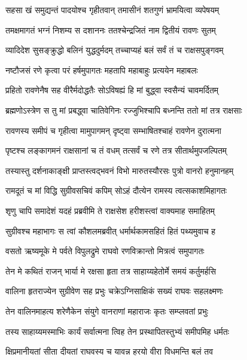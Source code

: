 \twolineshloka
{सहसा खं समुद्यन्तं पादयोश्च गृहीतवान्}
{तमासीनं शतगुणं भ्रामयित्वा व्यपेषयम्} %

\twolineshloka
{तमक्षमागतं भग्नं निशम्य स दशाननः}
{ततश्चेन्द्रजितं नाम द्वितीयं रावणः सुतम्} %

\twolineshloka
{व्यादिदेश सुसङ्क्रुद्धो बलिनं युद्धदुर्मदम्}
{तच्चाप्यहं बलं सर्वं तं च राक्षसपुङ्गवम्} %

\twolineshloka
{नष्टौजसं रणे कृत्वा परं हर्षमुपागतः}
{महतापि महाबाहुः प्रत्ययेन महाबलः} %

\twolineshloka
{प्रहितो रावणेनैष सह वीरैर्मदोद्धतैः}
{सोऽविषह्यं हि मां बुद्ध्वा स्वसैन्यं चावमर्दितम्} %

\twolineshloka
{ब्रह्मणोऽस्त्रेण स तु मां प्रबद्ध्वा चातिवेगिनः}
{रज्जुभिश्चापि बध्नन्ति ततो मां तत्र राक्षसाः} %

\twolineshloka
{रावणस्य समीपं च गृहीत्वा मामुपागमन्}
{दृष्ट्वा सम्भाषितश्चाहं रावणेन दुरात्मना} %

\twolineshloka
{पृष्टश्च लङ्कागमनं राक्षसानां च तं वधम्}
{तत्सर्वं च रणे तत्र सीतार्थमुपजल्पितम्} %

\twolineshloka
{तस्यास्तु दर्शनाकाङ्क्षी प्राप्तस्त्वद्भवनं विभो}
{मारुतस्यौरसः पुत्रो वानरो हनुमानहम्} %

\twolineshloka
{रामदूतं च मां विद्धि सुग्रीवसचिवं कपिम्}
{सोऽहं दौत्येन रामस्य त्वत्सकाशमिहागतः} %

\twolineshloka
{शृणु चापि समादेशं यदहं प्रब्रवीमि ते}
{राक्षसेश हरीशस्त्वां वाक्यमाह समाहितम्} %

\twolineshloka
{सुग्रीवश्च महाभागः स त्वां कौशलमब्रवीत्}
{धर्मार्थकामसहितं हितं पथ्यमुवाच ह} %

\twolineshloka
{वसतो ऋष्यमूके मे पर्वते विपुलद्रुमे}
{राघवो रणविक्रान्तो मित्रत्वं समुपागतः} %

\twolineshloka
{तेन मे कथितं राजन् भार्या मे रक्षसा हृता}
{तत्र साहाय्यहेतोर्मे समयं कर्तुमर्हसि} %

\twolineshloka
{वालिना हृतराज्येन सुग्रीवेण सह प्रभुः}
{चक्रेऽग्निसाक्षिकं सख्यं राघवः सहलक्ष्मणः} %

\twolineshloka
{तेन वालिनमाहत्य शरेणैकेन संयुगे}
{वानराणां महाराजः कृतः सम्प्लवतां प्रभुः} %

\twolineshloka
{तस्य साहाय्यमस्माभिः कार्यं सर्वात्मना त्विह}
{तेन प्रस्थापितस्तुभ्यं समीपमिह धर्मतः} %

\twolineshloka
{क्षिप्रमानीयतां सीता दीयतां राघवस्य च}
{यावन्न हरयो वीरा विधमन्ति बलं तव} %

